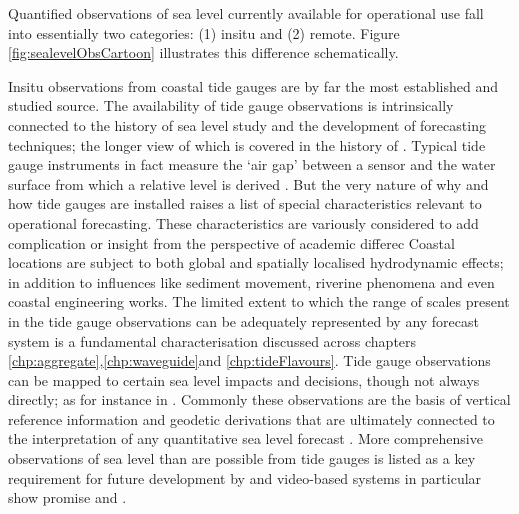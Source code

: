 Quantified observations of sea level currently available for operational use fall into essentially two categories: (1) insitu and (2) remote.    Figure \ref{fig:sealevelObsCartoon} illustrates this difference schematically.

Insitu observations from coastal tide gauges are by far the most established and studied source.    The availability of tide gauge observations is intrinsically connected to the history of sea level study and the development of forecasting techniques; the longer view of which is covered in the history of \citeauthor{Cartwright:2000tt}.
Typical tide gauge instruments in fact measure the `air gap' between a sensor and the water surface from which a relative level is derived \citep{PCTMSL-sp9}. 
But the very nature of why and how tide gauges are installed raises a list of special characteristics relevant to operational forecasting. These characteristics are variously considered to add complication or insight from the perspective of academic  differec
Coastal locations are subject to both global and spatially localised hydrodynamic effects; in addition to influences like sediment movement, riverine phenomena and even coastal engineering works.   
The limited extent to which the range of scales present in the tide gauge observations can be adequately represented by any forecast system is a fundamental characterisation discussed across chapters \ref{chp:aggregate},\ref{chp:waveguide}and \ref{chp:tideFlavours}.    
Tide gauge observations can be mapped to certain sea level impacts and decisions, though not always directly; as for instance in \cite{Hague:2019ha}. 
Commonly these observations are the basis of vertical reference information and geodetic derivations that are ultimately connected to the interpretation of any quantitative sea level forecast \citep{Woppelmann:2006un}\citep{AVWS2021}.
More comprehensive observations of sea level than are possible from tide gauges is listed as a key requirement for future development by \citeauthor{10.3389/fmars.2019.00437} and video-based systems in particular show promise \citep{10.1175/jtech-d-18-0203.1} and \cite{2018agufmep52d..26h}. 
